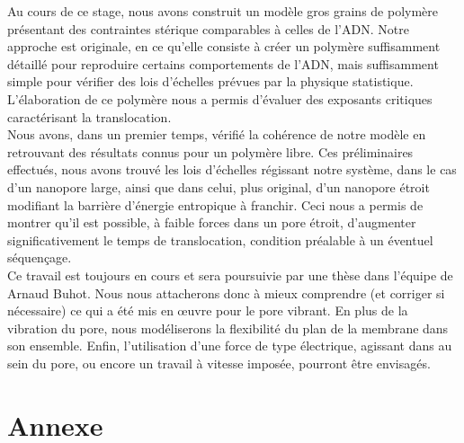 \documentclass[a4paper,11pt]{article}
\begin{document}
Au cours de ce stage, nous avons construit un modèle gros grains de polymère présentant des contraintes stérique comparables à celles de l'ADN. Notre approche est originale, en ce qu'elle consiste à créer un polymère suffisamment détaillé pour reproduire certains comportements de l'ADN, mais suffisamment simple pour vérifier des lois d'échelles prévues par la physique statistique. L'élaboration de ce polymère nous a permis d'évaluer des exposants critiques caractérisant la translocation.\\

Nous avons, dans un premier temps, vérifié la cohérence de notre modèle en retrouvant des résultats connus pour un polymère libre. Ces préliminaires effectués, nous avons trouvé les lois d'échelles régissant notre système, dans le cas d'un nanopore large, ainsi que dans celui, plus original, d'un nanopore étroit modifiant la barrière d'énergie entropique à franchir. Ceci nous a permis de montrer qu'il est possible, à faible forces dans un pore étroit, d'augmenter significativement le temps de translocation, condition préalable à un éventuel séquençage.\\

Ce travail est toujours en cours et sera poursuivie par une thèse dans l'équipe de Arnaud Buhot. Nous nous attacherons donc à mieux comprendre (et corriger si nécessaire) ce qui a été mis en œuvre pour le pore vibrant. En plus de la vibration du pore, nous modéliserons la flexibilité du plan de la membrane dans son ensemble. Enfin, l'utilisation d'une force de type électrique, agissant dans au sein du pore, ou encore un travail à vitesse imposée, pourront être envisagés.







\newpage

\section{Annexe}
\end{document}
